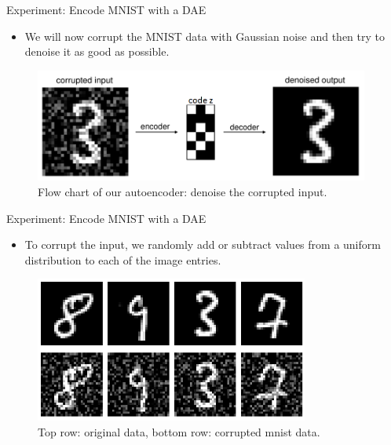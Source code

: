 \begin{frame}{Experiment: Encode MNIST with a DAE}
  \begin{itemize}
    \item We will now corrupt the MNIST data with Gaussian noise and then try to denoise it as good as possible.
  \end{itemize}
  \begin{figure}
    \centering
    \includegraphics[width=11cm]{plots/denoised_autoencoder_mnist_problem.png}
    \caption{Flow chart of our autoencoder: denoise the corrupted input.}
  \end{figure}  
\end{frame}
\begin{frame}{Experiment: Encode MNIST with a DAE}
  \begin{itemize}
    \item To corrupt the input, we randomly add or subtract values from a uniform distribution to each of the image entries.
  \end{itemize}
  \begin{figure}
    \centering
    \includegraphics[width=9cm]{plots/mnist_noise.png}
    \caption{Top row: original data, bottom row: corrupted mnist data.}
  \end{figure}
\end{frame}

